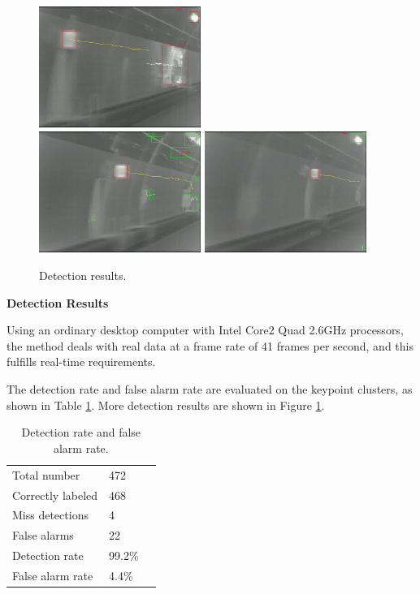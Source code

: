 \begin{figure}
{}
{
\includegraphics[width=0.47\textwidth,bb=0 0 640 480]{02veriTrjimg00046.jpg}
}\\
{
\includegraphics[width=0.47\textwidth,bb=0 0 640 480]{00veriTrjimg00032.jpg}
}
{
\includegraphics[width=0.47\textwidth,bb=0 0 640 480]{06veriTrjimg00032.jpg}
}

\caption[Detection results]{Detection results.}
\label{fig:sixs}
\end{figure}

\textbf{Detection Results}

Using an ordinary desktop computer with Intel Core2 Quad 2.6GHz processors, the method deals with real data at a frame rate of 41 frames per second, and this fulfills real-time requirements.


The detection rate and false alarm rate are evaluated on the keypoint clusters, as shown in Table \ref{tb:tb2}.
More detection results are shown in Figure \ref{fig:sixs}.
\begin{table}[h]
\centering
\begin{tabular}{lll}
     \hline
     \hline
    Total number &	472  \\
    Correctly labeled &	468   \\
    Miss detections &	4 &	  \\
    False alarms &	22    \\
    Detection rate &	99.2\% &	  \\
    False alarm rate &	4.4\% &	   \\
   \hline
\end{tabular}
\caption[Detection rate and false alarm rate]{Detection rate and false alarm rate.}\label{tb:tb2}
\end{table}





